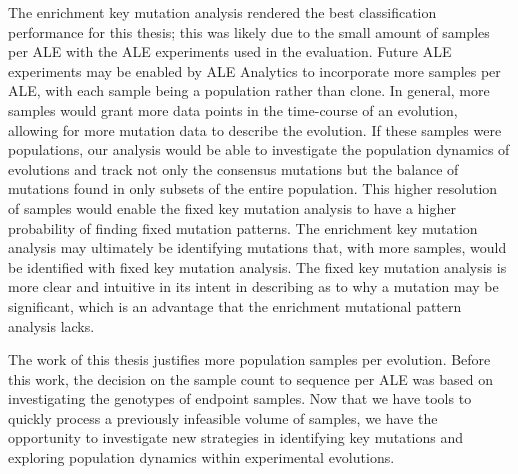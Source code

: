 \documentclass[12pt,final,masters,chapterheads]{ucsd}  %
\begin{document}
The enrichment key mutation analysis rendered the best classification performance for this thesis; this was likely due to the small amount of samples per ALE with the ALE experiments used in the evaluation. Future ALE experiments may be enabled by ALE Analytics to incorporate more samples per ALE, with each sample being a population rather than clone. In general, more samples would grant more data points in the time-course of an evolution, allowing for more mutation data to describe the evolution. If these samples were populations, our analysis would be able to investigate the population dynamics of evolutions and track not only the consensus mutations but the balance of mutations found in only subsets of the entire population. This higher resolution of samples would enable the fixed key mutation analysis to have a higher probability of finding fixed mutation patterns. The enrichment key mutation analysis may ultimately be identifying mutations that, with more samples, would be identified with fixed key mutation analysis. The fixed key mutation analysis is more clear and intuitive in its intent in describing as to why a mutation may be significant, which is an advantage that the enrichment mutational pattern analysis lacks.

The work of this thesis justifies more population samples per evolution. Before this work, the decision on the sample count to sequence per ALE was based on investigating the genotypes of endpoint samples. Now that we have tools to quickly process a previously infeasible volume of samples, we have the opportunity to investigate new strategies in identifying key mutations and exploring population dynamics within experimental evolutions.
\end{document}
